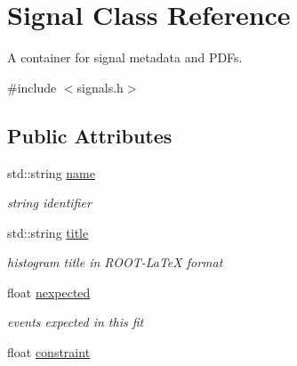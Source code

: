 \hypertarget{structSignal}{
\section{Signal Class Reference}
\label{structSignal}
}


A container for signal metadata and PDFs.  




{\ttfamily \#include $<$signals.h$>$}

\subsection*{Public Attributes}
\begin{DoxyCompactItemize}
\item 
\hypertarget{structSignal_a9eb6a4c5b81ec1f39feb9c77d8e7affe}{
std::string \hyperlink{structSignal_a9eb6a4c5b81ec1f39feb9c77d8e7affe}{name}}
\label{structSignal_a9eb6a4c5b81ec1f39feb9c77d8e7affe}

\begin{DoxyCompactList}\small\item\em string identifier \item\end{DoxyCompactList}\item 
\hypertarget{structSignal_a48976cc492d686858876b2738176c7f4}{
std::string \hyperlink{structSignal_a48976cc492d686858876b2738176c7f4}{title}}
\label{structSignal_a48976cc492d686858876b2738176c7f4}

\begin{DoxyCompactList}\small\item\em histogram title in ROOT-\/LaTeX format \item\end{DoxyCompactList}\item 
\hypertarget{structSignal_ac84c07221d773bbaddb0a6531b09a32d}{
float \hyperlink{structSignal_ac84c07221d773bbaddb0a6531b09a32d}{nexpected}}
\label{structSignal_ac84c07221d773bbaddb0a6531b09a32d}

\begin{DoxyCompactList}\small\item\em events expected in this fit \item\end{DoxyCompactList}\item 
\hypertarget{structSignal_ae5cd6cd41dc5c0cdf634b2a3e4eea4a9}{
float \hyperlink{structSignal_ae5cd6cd41dc5c0cdf634b2a3e4eea4a9}{constraint}}
\label{structSignal_ae5cd6cd41dc5c0cdf634b2a3e4eea4a9}


\end{DoxyCompactItemize}
